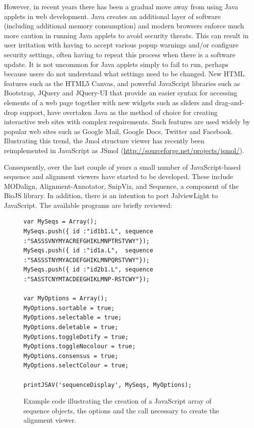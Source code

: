\documentclass[10pt,a4paper,twocolumn]{article}
\begin{document}
However, in recent years there has been a gradual move away from using
Java applets in web development.  Java creates an additional layer of
software (including additional memory consumption) and modern browsers
enforce much more caution in running Java applets to avoid security
threats. This can result in user irritation with having to accept
various popup warnings and/or configure security settings, often
having to repeat this process when there is a software update. It is
not uncommon for Java applets simply to fail to run, perhaps because
users do not understand what settings need to be changed.  New HTML
features such as the HTML5 Canvas, and powerful JavaScript libraries
such as Bootstrap, JQuery and JQuery-UI that provide an easier syntax
for accessing elements of a web page together with new widgets such as
sliders and drag-and-drop support, have overtaken Java as the method
of choice for creating interactive web sites with complex
requirements.  Such features are used widely by popular web sites such
as Google Mail, Google Docs, Twitter and Facebook.  Illustrating this
trend, the Jmol structure viewer has recently been reimplemented in
JavaScript as JSmol (\url{http://sourceforge.net/projects/jsmol/}).

Consequently, over the last couple of years a small number of
JavaScript-based sequence and alignment viewers have started to be
developed. These include MODalign\cite{barbato:modalign},
Alignment-Annotator\cite{gille:2014aa}, SnipViz\cite{jaschob:2014},
and Sequence\cite{gomez:2014}, a component of the BioJS
library\cite{corpas:biojs}. In addition, there is an intention to port
JalviewLight to JavaScript.  The available programs are briefly
reviewed:

\begin{figure}[t]
\begin{verbatim}
var MySeqs = Array();
MySeqs.push({ id :"id1b1.L", sequence :"SASSSVNYMYACREFGHIKLMNPTRSTVWY"});
MySeqs.push({ id :"id1a.L",  sequence :"SASSSTNYMYACDEFGHIKLMNPQRSTVWY"});
MySeqs.push({ id :"id2b1.L", sequence :"SASSTCNYMTACDEEGHIKLMNP-RSTCWY"});

var MyOptions = Array();
MyOptions.sortable = true;
MyOptions.selectable = true;
MyOptions.deletable = true;
MyOptions.toggleDotify = true;
MyOptions.toggleNocolour = true;
MyOptions.consensus = true;
MyOptions.selectColour = true;

printJSAV('sequenceDisplay', MySeqs, MyOptions);
\end{verbatim}
\caption{\label{fig:code}Example code illustrating the creation of a
JavaScript array of sequence objects, the options and the call
necessary to create the alignment viewer.}
\end{figure}
\end{document}

